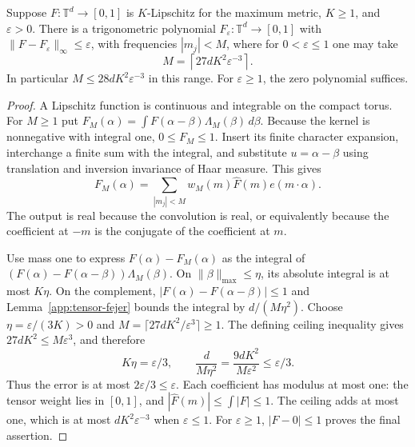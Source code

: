 \begin{lemma}
\label{app:trigonometric-approximation}
\leanok
{}
Suppose $F:\mathbb T^d\to[0,1]$ is $K$-Lipschitz for the maximum metric,
$K\geq1$, and $\varepsilon>0$.  There is a trigonometric polynomial
$F_\varepsilon:\mathbb T^d\to[0,1]$ with
$\|F-F_\varepsilon\|_\infty\leq\varepsilon$, with frequencies
$|m_j|<M$, where for $0<\varepsilon\leq1$ one may take
\[
 M=\left\lceil27dK^2\varepsilon^{-3}\right\rceil.
\]
In particular $M\leq28dK^2\varepsilon^{-3}$ in this range.
For $\varepsilon\geq1$, the zero polynomial suffices.
\end{lemma}
\begin{proof}
A Lipschitz function is continuous and integrable on the compact torus.
For $M\geq1$ put
$F_M(\alpha)=\int F(\alpha-\beta)\Lambda_M(\beta)\,d\beta$.
Because the kernel is nonnegative with integral one, $0\leq F_M\leq1$.
Insert its finite character expansion, interchange a finite sum with the
integral, and substitute $u=\alpha-\beta$ using translation and inversion
invariance of Haar measure.  This gives
\[
 F_M(\alpha)=\sum_{|m_j|<M}w_M(m)\widehat F(m)e(m\cdot\alpha).
\]
The output is real because the convolution is real, or equivalently because
the coefficient at $-m$ is the conjugate of the coefficient at $m$.

Use mass one to express $F(\alpha)-F_M(\alpha)$ as the integral of
$(F(\alpha)-F(\alpha-\beta))\Lambda_M(\beta)$.
On $\|\beta\|_{\max}\leq\eta$, its absolute integral is at most $K\eta$.
On the complement, $|F(\alpha)-F(\alpha-\beta)|\leq1$ and
Lemma~\ref{app:tensor-fejer} bounds the integral by $d/(M\eta^2)$.
Choose $\eta=\varepsilon/(3K)>0$ and
$M=\lceil27dK^2/\varepsilon^3\rceil\geq1$.
The defining ceiling inequality gives
$27dK^2\leq M\varepsilon^3$, and therefore
\[
 K\eta=\varepsilon/3,\qquad
 \frac d{M\eta^2}=\frac{9dK^2}{M\varepsilon^2}
 \leq\varepsilon/3.
\]
Thus the error is at most $2\varepsilon/3\leq\varepsilon$.
Each coefficient has modulus at most one: the tensor weight lies in
$[0,1]$, and $|\widehat F(m)|\leq\int|F|\leq1$.
The ceiling adds at most one, which is at most
$dK^2\varepsilon^{-3}$ when $\varepsilon\leq1$.
For $\varepsilon\geq1$, $|F-0|\leq1$ proves the final assertion.
\end{proof}

